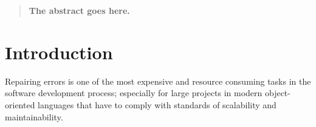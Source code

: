 \documentclass[conference]{IEEEtran}
\newcommand{\todo}[1]
  {{\scriptsize \textbf{\color{red} {#1}}}}
\begin{document}




\maketitle

\begin{abstract}
\todo{The abstract goes here.}
\end{abstract}





%
\IEEEpeerreviewmaketitle



\section{Introduction}



Repairing errors is one of the most expensive and resource consuming tasks in 
the software development process; especially for large projects in modern 
object-oriented languages that have to comply with standards of scalability and 
maintainability. 
\end{document}
